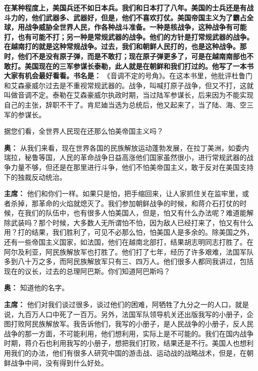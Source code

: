 \begin{duihua}
\item[\textbf{在某种程度上，美国兵还不如日本兵。我们和日本打了八年。美国的士兵还是有战斗力的，他们武器多、武器好，但是，他们不喜欢打仗。美国帝国主义为了霸占全球，用战争威胁全世界人民，作各种战斗准备。一种是核战争，这种战争有可能打，也有可能不打；另一种是常规武器的战争。他们的方针是打常规武器的战争。在越南打的就是这种常规战争。过去，我们和朝鲜人民打的，也是这种战争。那时，他们不是没有原子弹，而是不敢打；现在原子弹更多了，可是在越南南部也不敢打。美国现在的三军参谋长泰勒，此人就是在朝鲜和我们打过的。他写了一本书大家有机会最好看看。书名是：}] 《音调不定的号角》。在这本书里，他批评杜鲁门和艾森豪威尔过去是不重视常规武器的。战争，叫喊打原子战争，但又不打，这就叫做音调不定。泰勒在艾森豪威尔执政时期，当过陆军参谋长，后来因为不能实现自己的主张，辞职不干了。肯尼廸当选为总统后，他又起来了，当了陆、海、空三军的参谋长。

据您们看，全世界人民现在还那么怕美帝国主义吗？

\item[\textbf{奥：}] 从我们来看，现在世界各国的民族解放运动蓬勃发展，在拉丁美洲，如委内瑞拉，秘鲁等国，人民的革命战争日益高涨他们国家虽然很小，进行常规武器的战争力量不够，但还是在那里进行斗争，他们不怕美帝国主义，敢于反对在美国支持下的独裁反动统治。

\item[\textbf{主席：}] 他们和你们一样。如果只是怕，把手缩回来，让人家抓住关在监牢里，或者杀掉，那革命的火焰就熄灭了。我们参加朝鲜战争的时候，和蒋介石打仗的时候，在我们的队伍中，也有很多人怕美国人，但是，怕又有什么办法呢？难道能解除武装吗？那个时候，大多数人无所谓怕不怕，因为敌人已经打来了，怕又有什么用？打的结果，我们胜利了，可见不必那么怕，怕美国人是多余的。除美国之外，还有一些帝国主义国家，如法国，他们在越南北部打，结果胡志明同志打胜了。在阿尔及利亚，阿民族解放军也打胜了。他们打了七年，经历了许多艰难，法国军队多到八十万之多，而阿民族解放军只有三、四万人。他们很多人都同我讲过，包括现在的议长，过去的总理阿巴斯。你们知道阿巴斯吗？

\item[\textbf{奥：}] 知道他的名字。

\item[\textbf{主席：}] 他们对我们谈过很多，谈过他们的困难，阿牺牲了九分之一的人口，就是说，九百万人口中死了一百万。另外，法国军队领导机关还出版我写的小册子，企图打败阿民族解放军。我告诉他们，我写的小册子，是人民战争的小册子，反人民战争的那一方面，不可能利用，他们想利用，实际上是不可能的。我们在国内战争时期，蒋介石也利用我写的小册子，想把我们打败，结果还是不行。美国人也想利用我们的办法，他们有很多人研究中国的游击战、运动战的战略战术，但是，在朝鲜战争中间，没有得到什么好处。


\end{duihua}
